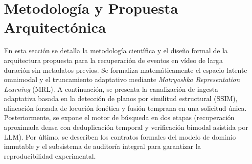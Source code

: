 \section{Metodología y Propuesta Arquitectónica}
\label{sec:metodologia_arquitectura}

En esta sección se detalla la metodología científica y el diseño formal de la arquitectura propuesta para la recuperación de eventos en vídeo de larga duración sin metadatos previos. Se formaliza matemáticamente el espacio latente omnimodal y el truncamiento adaptativo mediante \textit{Matryoshka Representation Learning} (MRL). A continuación, se presenta la canalización de ingesta adaptativa basada en la detección de planos por similitud estructural (SSIM), alineación forzada de locución fonética y fusión temprana en una solicitud única. Posteriormente, se expone el motor de búsqueda en dos etapas (recuperación aproximada densa con deduplicación temporal y verificación bimodal asistida por LLM). Por último, se describen los contratos formales del modelo de dominio inmutable y el subsistema de auditoría integral para garantizar la reproducibilidad experimental.


\newpage


\newpage


\newpage


